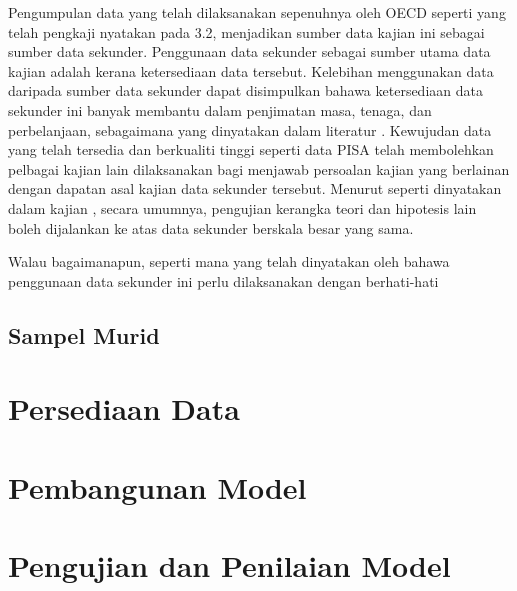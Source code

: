 Pengumpulan data yang telah dilaksanakan sepenuhnya oleh OECD seperti yang telah pengkaji nyatakan pada 3.2, menjadikan sumber data kajian ini sebagai sumber data sekunder. Penggunaan data sekunder sebagai sumber utama data kajian adalah kerana ketersediaan data tersebut. Kelebihan menggunakan data daripada sumber data sekunder dapat disimpulkan bahawa ketersediaan data sekunder ini banyak membantu dalam penjimatan masa, tenaga, dan perbelanjaan, sebagaimana yang dinyatakan dalam literatur \cite{Ayob2018, Johnston2014, Panchenko2020}. Kewujudan data yang telah tersedia dan berkualiti tinggi seperti data PISA telah membolehkan pelbagai kajian lain dilaksanakan bagi menjawab persoalan kajian yang berlainan dengan dapatan asal kajian data sekunder tersebut. Menurut \citet{Johnston2014} seperti dinyatakan dalam kajian \citet{Ayob2018}, secara umumnya, pengujian kerangka teori dan hipotesis lain boleh dijalankan ke atas data sekunder berskala besar yang sama. 

Walau bagaimanapun, seperti mana yang telah dinyatakan oleh \citet{Ayob2018} bahawa penggunaan data sekunder ini perlu dilaksanakan dengan berhati-hati

\subsection{Sampel Murid}

\section{Persediaan Data}

\section{Pembangunan Model}

\section{Pengujian dan Penilaian Model}
